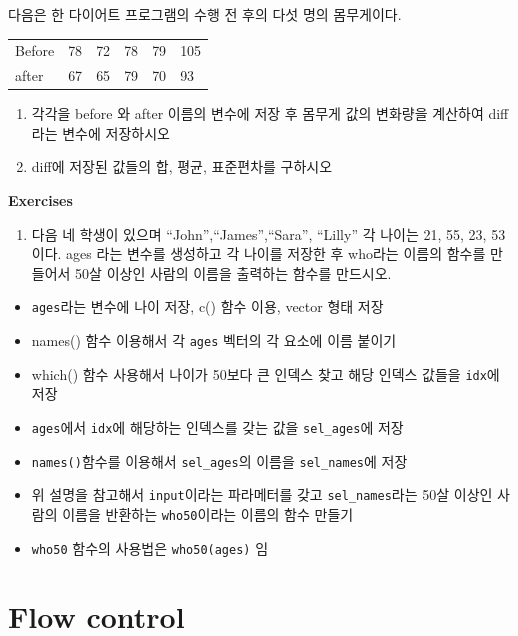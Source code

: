\documentclass[
  a4paper,
]{book}
\providecommand{\tightlist}{%
  \setlength{\itemsep}{0pt}\setlength{\parskip}{0pt}}\usepackage{longtable,booktabs,array}
\begin{document}
다음은 한 다이어트 프로그램의 수행 전 후의 다섯 명의 몸무게이다.

\begin{longtable}[]{@{}llllll@{}}
\toprule\noalign{}
\endhead
\bottomrule\noalign{}
\endlastfoot
Before & 78 & 72 & 78 & 79 & 105 \\
after & 67 & 65 & 79 & 70 & 93 \\
\end{longtable}

\begin{enumerate}
\def\labelenumi{\arabic{enumi})}
\item
  각각을 before 와 after 이름의 변수에 저장 후 몸무게 값의 변화량을
  계산하여 diff 라는 변수에 저장하시오
\item
  diff에 저장된 값들의 합, 평균, 표준편차를 구하시오
\end{enumerate}

\textbf{Exercises}

\begin{enumerate}
\def\labelenumi{\arabic{enumi})}
\tightlist
\item
  다음 네 학생이 있으며 ``John'',``James'',``Sara'', ``Lilly'' 각 나이는
  21, 55, 23, 53 이다. ages 라는 변수를 생성하고 각 나이를 저장한 후
  who라는 이름의 함수를 만들어서 50살 이상인 사람의 이름을 출력하는
  함수를 만드시오.
\end{enumerate}

\begin{itemize}
\tightlist
\item
  \texttt{ages}라는 변수에 나이 저장, c() 함수 이용, vector 형태 저장
\item
  names() 함수 이용해서 각 \texttt{ages} 벡터의 각 요소에 이름 붙이기
\item
  which() 함수 사용해서 나이가 50보다 큰 인덱스 찾고 해당 인덱스 값들을
  \texttt{idx}에 저장
\item
  \texttt{ages}에서 \texttt{idx}에 해당하는 인덱스를 갖는 값을
  \texttt{sel\_ages}에 저장
\item
  \texttt{names()}함수를 이용해서 \texttt{sel\_ages}의 이름을
  \texttt{sel\_names}에 저장
\item
  위 설명을 참고해서 \texttt{input}이라는 파라메터를 갖고
  \texttt{sel\_names}라는 50살 이상인 사람의 이름을 반환하는
  \texttt{who50}이라는 이름의 함수 만들기
\item
  \texttt{who50} 함수의 사용법은 \texttt{who50(ages)} 임
\end{itemize}

\hypertarget{flow-control}{%
\section{Flow control}\label{flow-control}}
\end{document}
